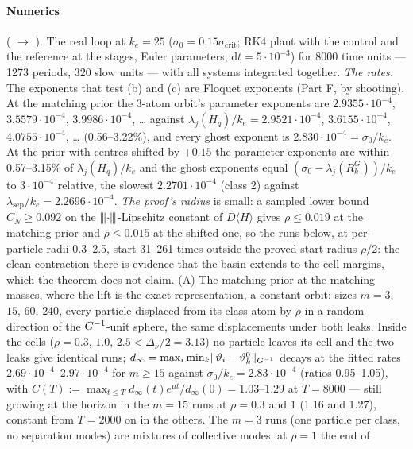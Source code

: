 \paragraph{Numerics} ( $\to$ ). The real loop at
$k_e = 25$ ($\sigma_0 = 0.15\sigma_{\mathrm{crit}}$; RK4 plant with the control and the reference at the stages, Euler
parameters, $\mathrm{d}t = 5\cdot10^{-3}$) for 8000 time units --- 1273 periods, 320 slow units --- with all systems
integrated together. \emph{The rates.} The exponents that test (b) and (c) are Floquet exponents (Part F, by
shooting). At the matching prior the 3-atom orbit's parameter exponents are $2.9355\cdot10^{-4}$,
$3.5579\cdot10^{-4}$, $3.9986\cdot10^{-4}$, \dots{} against $\lambda_j(H_q)/k_e = 2.9521\cdot10^{-4}$,
$3.6155\cdot10^{-4}$, $4.0755\cdot10^{-4}$, \dots{} (0.56--3.22\%), and every ghost exponent is
$2.830\cdot10^{-4} = \sigma_0/k_e$. At the prior with centres shifted by $+0.15$ the parameter exponents are within
0.57--3.15\% of $\lambda_j(H_q)/k_e$ and the ghost exponents equal $(\sigma_0 - \lambda_j(R^G_k))/k_e$ to
$3\cdot10^{-4}$ relative, the slowest $2.2701\cdot10^{-4}$ (class 2) against
$\lambda_{\mathrm{sep}}/k_e = 2.2696\cdot10^{-4}$. \emph{The proof's radius} is small: a sampled lower bound
$C_N\ge0.092$ on the $\lvert\kern-0.25ex\lvert\kern-0.25ex\lvert \cdot\rvert\kern-0.25ex\rvert\kern-0.25ex\rvert$-Lipschitz constant of $D\langle H\rangle$ gives $\rho\le0.019$ at the matching
prior and $\rho\le0.015$ at the shifted one, so the runs below, at per-particle radii 0.3--2.5, start 31--261 times
outside the proved start radius $\rho/2$: the clean contraction there is evidence that the basin extends to the cell
margins, which the theorem does not claim. (A) The matching prior at the matching masses, where the lift is the exact
representation, a constant orbit: sizes $m = 3$, $15$, $60$, $240$, every particle displaced from its class atom by
$\rho$ in a random direction of the $G^{-1}$-unit sphere, the same displacements under both leaks. Inside the cells
($\rho = 0.3$, $1.0$, $2.5 < \Delta_\nu/2 = 3.13$) no particle leaves its cell and the two leaks give identical runs;
$d_\infty = \max_i\min_k\lVert \vartheta_i - \vartheta^0_k\rVert_{G^{-1}}$ decays at the fitted rates
$2.69\cdot10^{-4}$--$2.97\cdot10^{-4}$ for $m\ge15$ against $\sigma_0/k_e = 2.83\cdot10^{-4}$ (ratios 0.95--1.05),
with $C(T) := \max_{t\le T}d_\infty(t)e^{\mu t}/d_\infty(0) = 1.03$--$1.29$ at $T = 8000$ --- still growing at the
horizon in the $m = 15$ runs at $\rho = 0.3$ and $1$ (1.16 and 1.27), constant from $T = 2000$ on in the others. The
$m = 3$ runs (one particle per class, no separation modes) are mixtures of collective modes: at $\rho = 1$ the end of
